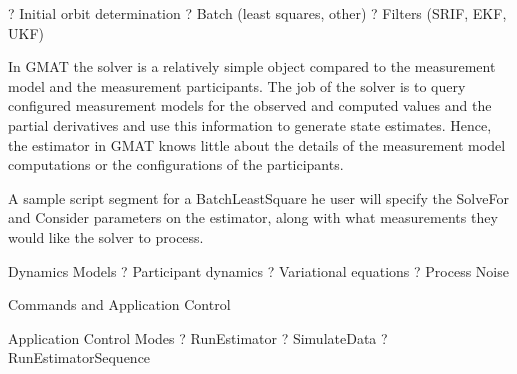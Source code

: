 ?   Initial orbit determination ?   Batch (least squares, other) ?
Filters (SRIF, EKF, UKF)

In GMAT the solver is a relatively simple object compared to the
measurement model and the measurement  participants.  The job of the
solver is to query configured measurement models for the observed
and computed values  and the partial derivatives  and use this
information  to generate state estimates.  Hence,  the estimator in
GMAT knows little about the details of the measurement model
computations or the configurations of the participants.

A sample script segment for a BatchLeastSquare he user will specify
the SolveFor and Consider parameters on the estimator, along with
what measurements they would like the solver to process.

%

Dynamics Models ?   Participant dynamics ?   Variational equations ?
Process Noise

Commands and Application Control

Application Control Modes ?   RunEstimator ?   SimulateData ?
RunEstimatorSequence
